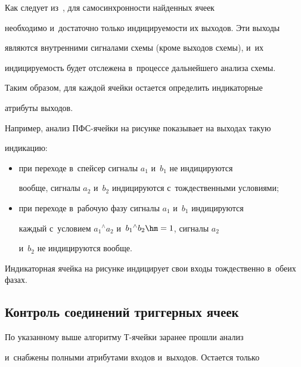    


   Как следует из~\cite[с.~92]{3-ple}, для самосинхронности найденных ячеек 


необходимо и~достаточно только индицируемости их выходов. Эти выходы 


являются внут\-рен\-ни\-ми сигналами схемы (кроме выходов схемы), и~их 


индицируемость будет отслежена в~процессе дальнейшего анализа схемы.


   


   Таким образом, для каждой ячейки остается определить индикаторные 


атрибуты выходов.


   


   Например, анализ ПФС-ячейки на рисунке показывает на выходах такую 


индикацию:


   \begin{itemize}


    \item при переходе в~спейсер сигналы $a_1$ и~$b_1$ не индицируются 


вообще, сигналы $a_2$ и~$b_2$ индицируются с~тождественными условиями;


   \item при переходе в~рабочую фазу сигналы $a_1$ и~$b_1$ индицируются 


каждый с~условием $a_1 {}^\wedge a_2$ и~$b_1{}^\wedge b_2\hm=1$, сигналы $a_2$ 


и~$b_2$ не индицируются вообще.


   \end{itemize}


   


   Индикаторная ячейка на рисунке индицирует свои входы тождественно в~обеих фазах.





\subsection{Контроль соединений триггерных ячеек}


       


   По указанному выше алгоритму Т-ячейки заранее прошли анализ 


и~снабжены полными атрибутами входов и~выходов. Остается только 


